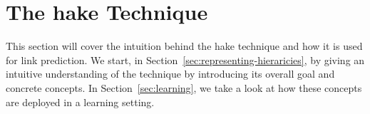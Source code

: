 \section{The \ac{hake} Technique}\label{sec:method}

This section will cover the intuition behind the \ac{hake} technique and how it is used for link prediction.
We start, in Section~\ref{sec:representing-hieraricies}, by giving an intuitive understanding of the technique by introducing its overall goal and concrete concepts.
In Section~\ref{sec:learning}, we take a look at how these concepts are deployed in a learning setting.




